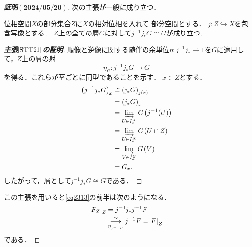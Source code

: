 \begin{proof}[\textbf{証明\((\mathbf{2024/05/20})\)}]
    次の主張が一般に成り立つ．
    \begin{leftbar}
    \begin{STT}\label{STT21}
        位相空間\(X\)の部分集合\(Z\)に\(X\)の相対位相を入れて
        部分空間とする．
        \(j\colon Z\hookrightarrow X\)を包含写像とする．
        \(Z\)上の全ての層\(G\)に対して\(
            j^{-1}j_{\ast}G\cong G
        \)が成り立つ．
    \end{STT}
    \end{leftbar}
    \begin{center}        
    \begin{minipage}{.9\textwidth}
    \begin{proof}[\textbf{主張\(\mathbf{\ref{STT21}}\)の証明}]
        順像と逆像に関する随伴の余単位\(
            \eta\colon j^{-1}j_{\ast}\to1
        \)を\(G\)に適用して，\(Z\)上の層の射\[
            \eta_G\colon j^{-1}j_{\ast}G\to G
        \]を得る．これらが茎ごとに同型であることを示す．
        \(x\in Z\)とする．
        \begin{align*}
            \left(j^{-1}j_{\ast}G\right)_x
            &\cong
            \left(j_{\ast}G\right)_{j(x)}\\
            &=
            \left(j_{\ast}G\right)_{x}\\
            &=
            \indlim[U\in I_{x}^{X}]G\left(j^{-1}(U)\right)\\
            &=
            \indlim[U\in I_{x}^{X}]G\left(U\cap Z\right)\\
            &=
            \indlim[V\in I_{x}^{Z}]G\left(V\right)\\
            &= G_{x}.
        \end{align*}
        したがって，層として\(
            j^{-1}j_{\ast}G\cong G
        \)である．
    \end{proof}
    \end{minipage}
    \end{center}
    この主張を用いると\eqref{eq2313}の前半は次のようになる．
    \begin{align*}
        \mres[F_Z]{Z}
        &=j^{-1}j_{\ast}j^{-1}F\\
        &\underset{\eta_{j^{-1}F}}{\simar}j^{-1}F=\mres[F]{Z}
    \end{align*}
    である．


\end{proof}
